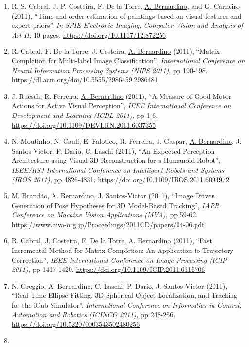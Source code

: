 \documentclass[
]{article}
\begin{document}
\begin{enumerate}
  \url{https://doi.org/10.1007/978-3-642-33179-4_17}~
\item
  R. S. Cabral, J. P. Costeira, F. De la Torre, \ul{A. Bernardino}, and
  G. Carneiro (2011), ``Time and order estimation of paintings based on
  visual features and expert priors''. \emph{In SPIE Electronic Imaging,
  Computer Vision and Analysis of Art II,} 10 pages.
  \url{https://doi.org/10.1117/12.872256}~
\item
  R. Cabral, F. De la Torre, J. Costeira, \ul{A. Bernardino} (2011),
  ``Matrix Completion for Multi-label Image Classification'',
  \emph{International Conference on Neural Information Processing
  Systems} \emph{(NIPS 2011)}, pp 190-198.
  \url{https://dl.acm.org/doi/10.5555/2986459.2986481}
\item
  J. Ruesch, R. Ferreira, \ul{A. Bernardino} (2011), ``A Measure of Good
  Motor Actions for Active Visual Perception'', \emph{IEEE International
  Conference on Development and Learning (ICDL 2011),} pp 1-6.
  \url{https://doi.org/10.1109/DEVLRN.2011.6037355}~
\item
  N. Moutinho, N. Cauli, E. Falotico, R. Ferreira, J. Gaspar, \ul{A.
  Bernardino}, J. Santos-Victor, P. Dario, C. Laschi (2011), ``An
  Expected Perception Architecture using Visual 3D Reconstruction for a
  Humanoid Robot'', \emph{IEEE/RSJ International Conference on
  Intelligent Robots and Systems (IROS 2011),} pp 4826-4831.
  \url{https://doi.org/10.1109/IROS.2011.6094972}~
\item
  M. Brandão, \ul{A. Bernardino}, J. Santos-Victor (2011), ``Image
  Driven Generation of Pose Hypotheses for 3D Model-Based Tracking'',
  \emph{IAPR Conference on Machine Vision Applications (MVA),} pp 59-62.
  \url{https://www.mva-org.jp/Proceedings/2011CD/papers/04-06.pdf}
\item
  R. Cabral, J. Costeira, F. De la Torre, \ul{A. Bernardino} (2011),
  ``Fast Incremental Method for Matrix Completion: An Application to
  Trajectory Correction'', \emph{IEEE International Conference on Image
  Processing (ICIP 2011),} pp 1417-1420.
  \url{https://doi.org/10.1109/ICIP.2011.6115706}~
\item
  N. Greggio, \ul{A. Bernardino}, C. Laschi, P. Dario, J. Santos-Victor
  (2011), ``Real-Time Ellipse Fitting, 3D Spherical Object Localization,
  and Tracking for the iCub Simulator''. \emph{International Conference
  on Informatics in Control, Automation and Robotics (ICINCO 2011),} pp
  248-256. \url{https://doi.org/10.5220/0003543502480256}~
\item

\end{enumerate}
\end{document}
